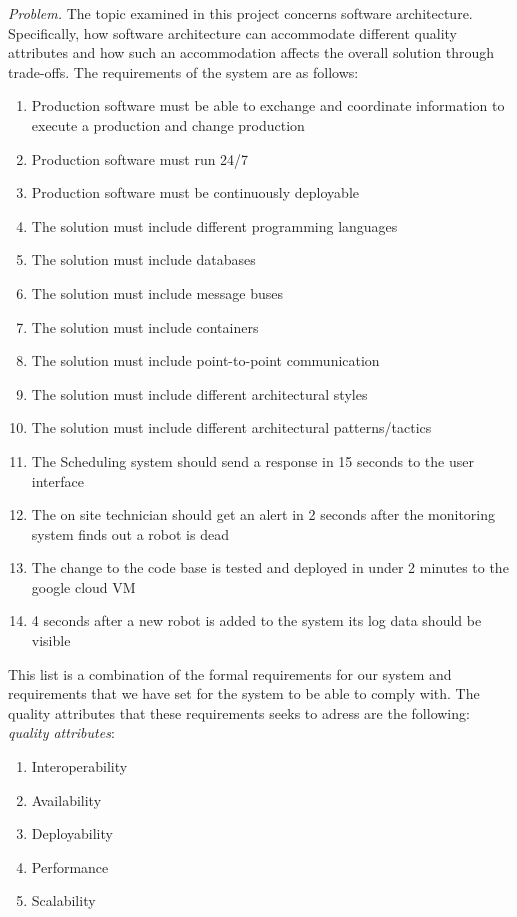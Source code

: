 
\emph{Problem.}
The topic examined in this project concerns software architecture. Specifically, how software architecture can accommodate different quality attributes and how such an accommodation affects the overall solution through trade-offs. The requirements of the system are as follows:
 
\begin{enumerate}
    \item Production software must be able to exchange and coordinate information to execute a production and change production
    \item Production software must run 24/7
    \item Production software must be continuously deployable
    \item The solution must include different programming languages
    \item The solution must include databases
    \item The solution must include message buses
    \item The solution must include containers
    \item The solution must include point-to-point communication
    \item The solution must include different architectural styles
    \item The solution must include different architectural patterns/tactics
    \item The Scheduling system should send a response in 15 seconds to the user interface
    \item The on site technician should get an alert in 2 seconds after the monitoring system finds out a robot is dead
    \item The change to the code base is tested and deployed in under 2 minutes to the google cloud VM
    \item 4 seconds after a new robot is added to the system its log data should be visible 
\end{enumerate}
This list is a combination of the formal requirements for our system and requirements that we have set for the system to be able to comply with. The quality attributes that these requirements seeks to adress are the following:
\emph{quality attributes}:
\begin{enumerate}
    \item Interoperability
    \item Availability
    \item Deployability
    \item Performance
    \item Scalability
\end{enumerate}

